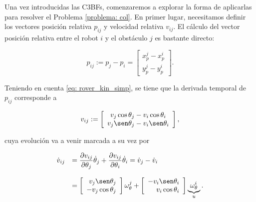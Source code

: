 Una vez introducidas las C3BFs, comenzaremos a explorar la forma de aplicarlas para resolver el Problema \ref{problema: col}. En primer lugar, necesitamos definir los vectores posición relativa $p_{ij}$ y velocidad relativa $v_{ij}$. El cálculo del vector posición relativa entre el robot $i$ y el obstáculo $j$ es bastante directo:

\begin{equation} \label{eq p_rel}
    p_{ij} := p_j - p_i =
    \left [
    \begin{array}{c}
        x_p^j - x_p^i \\
        y_p^j - y_p^i
    \end{array}
    \right ].
\end{equation}

Teniendo en cuenta \eqref{eq: rover_kin_simp}, se tiene que la derivada temporal de $p_{ij}$ corresponde a

\begin{equation} \label{eq v_rel}
    v_{ij} :=
    \left [
    \begin{array}{c}
        v_j\cos\theta_j - v_i\cos\theta_i \\
        v_j\sen\theta_j - v_i\sen\theta_i
    \end{array}
    \right ],
\end{equation}

cuya evolución va a venir marcada a su vez por

\begin{equation} \label{eq: dot_v_rel}
    \begin{array}{rl}
        \dot v_{ij} & = 
        \dfrac{\partial v_{ij}}{\partial \theta_j} \dot {\theta}_j +
        \dfrac{\partial v_{ij}}{\partial \theta_i} \dot {\theta}_i =
        \dot v_j - \dot v_i \\ \\
        & =
        \left [ 
        \begin{array}{r}
            v_j\sen\theta_j \\
            - v_j\cos\theta_j
        \end{array}
        \right ] \omega_{\theta}^j
        +
        \left [
        \begin{array}{r}
              - v_i\sen\theta_i \\
              v_i\cos\theta_i
        \end{array}
        \right ] 
        \underbrace{\omega_{\theta}^i}_{u}.
    \end{array}
\end{equation}

